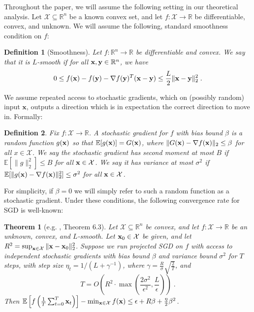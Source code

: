\documentclass{article}
\newcommand{\R}{\mathbb{R}}
\renewcommand{\vec}[1]{\mathbf{#1}}
\def\x{{\bf x}}
\def\y{{\bf y}}
\def\E{\mathbb{E}}
\newtheorem{theorem}{Theorem}
\newtheorem{definition}{Definition}
\begin{document}
Throughout the paper, we will assume the following setting in our theoretical analysis.
Let $\mathcal{X} \subseteq \R^n$ be a known convex set, and let $f: \mathcal{X} \to \R$ be differentiable, convex, and unknown.
We will assume the following, standard smoothness condition on $f$:
\begin{definition}[Smoothness]
Let $f: \R^n \to \R$ be differentiable and convex.
We say that it is $L$-smooth if for all $\x, \y \in \R^n$, we have
\[0 \leq f(\x) - f(\y) - \nabla f(\y)^T (\x - \y) \leq \frac{L}{2} \| \x - \y \|_2^2 \; .\]
\end{definition}

We assume repeated access to stochastic gradients, which on (possibly random) input $\vec{x}$, outputs a direction which is in expectation the correct direction to move in.
Formally:
\begin{definition}
Fix $f: \mathcal{X} \to \R$.
A \emph{stochastic gradient} for $f$ with bias bound $\beta$ is a random function $g (\x)$ so that $\E [g (\x) ] = G( \x)$, where $\| G(\x) - \nabla f(\x) \|_2 \leq \beta$ for all $x \in \mathcal{X}$.
We say the stochastic gradient has second moment at most $B$ if $\E [\| g \|_2^2] \leq B$ for all $\x \in \mathcal{X}$.
We say it has variance at most $\sigma^2$ if $\E [\| g (\x) - \nabla f(\x) \|_2^2] \leq \sigma^2$ for all $\x \in \mathcal{X}$. 
\end{definition}

For simplicity, if $\beta = 0$ we will simply refer to such a random function as a stochastic gradient.
Under these conditions, the following convergence rate for SGD is well-known:

\begin{theorem}[e.g. \cite{2014arXiv1405.4980B}, Theorem 6.3]
\label{thm:sgd}
Let $\mathcal{X} \subseteq \R^n$ be convex, and let $f: \mathcal{X} \to \R$ be an unknown, convex, and $L$-smooth.
Let $\x_0 \in \mathcal{X}$ be given, and let $R^2 = \sup_{\x \in \mathcal{X}} \| \x - \x_0 \|_2^2$.
Suppose we run projected SGD on $f$ with access to independent stochastic gradients with bias bound $\beta$ and variance bound $\sigma^2$ for $T$ steps, with step size $\eta_t = 1 / ( L + \gamma^{-1})$, where $\gamma = \frac{R}{\sigma} \sqrt{\frac{2}{T}}$, and
\begin{equation}
\label{eq:sgd-conv-2}
T = O \left( R^2 \cdot \max \left( \frac{2 \sigma^2}{\epsilon^2} , \frac{L}{\epsilon} \right) \right) \; .
\end{equation}
Then $\E \left[ f \left( \frac{1}{T} \sum_{t = 0}^T \x_t \right) \right] - \min_{\x \in \mathcal{X}} f(\x) \leq \epsilon + R \beta + \frac{\eta}{2} \beta^2$.
\end{theorem} 
\end{document}
